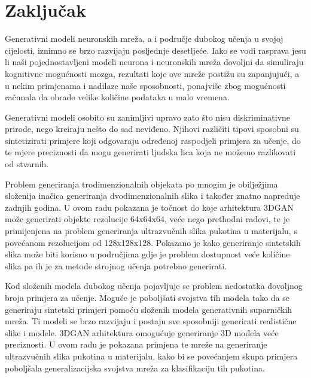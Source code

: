 \documentclass[times, utf8, diplomski]{fer}
\begin{document}
\chapter{Zaključak}
Generativni modeli neuronskih mreža, a i područje dubokog učenja u svojoj cijelosti, iznimno se brzo razvijaju posljednje desetljeće. Iako se vodi rasprava jesu li naši pojednostavljeni modeli neurona i neuronskih mreža dovoljni da simuliraju kognitivne mogućnosti mozga, rezultati koje ove mreže postižu su zapanjujući, a u nekim primjenama i nadilaze naše sposobnosti, ponajviše zbog mogućnosti računala da obrade velike količine podataka u malo vremena.

Generativni modeli osobito su zanimljivi upravo zato što nisu diskriminativne prirode, nego kreiraju nešto do sad neviđeno. Njihovi različiti tipovi sposobni su sintetizirati primjere koji odgovaraju određenoj raspodjeli primjera za učenje, do te mjere preciznosti da mogu generirati ljudska lica koja ne možemo razlikovati od stvarnih.

Problem generiranja trodimenzionalnih objekata po mnogim je obilježjima složenija inačica generiranja dvodimenzionalnih slika i također znatno napreduje zadnjih godina. U ovom radu pokazana je točnost do koje arhitektura 3DGAN može generirati objekte rezolucije 64x64x64, veće nego prethodni radovi, te je primijenjena na problem generiranja ultrazvučnih slika pukotina u materijalu, s povećanom rezolucijom od 128x128x128. Pokazano je kako generiranje sintetskih slika može biti korisno u područjima gdje je problem dostupnost veće količine slika pa ih je za metode strojnog učenja potrebno generirati.


\nocite{simple}


%

\begin{sazetak}
Kod složenih modela dubokog učenja pojavljuje se problem nedostatka dovoljnog broja primjera za učenje. Moguće je poboljšati svojstva tih modela tako da se generiraju sintetski primjeri pomoću složenih modela generativnih suparničkih mreža. Ti modeli se brzo razvijaju i postaju sve sposobniji generirati realistične slike i modele. 3DGAN arhitektura omogućuje generiranje 3D modela veće preciznosti. U ovom radu je pokazana primjena te mreže na generiranje ultrazvučnih slika pukotina u materijalu, kako bi se povećanjem skupa primjera poboljšala generalizacijska svojstva mreža za klasifikaciju tih pukotina.

\end{sazetak}
\end{document}
